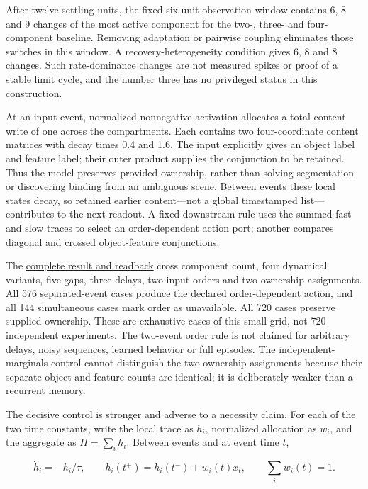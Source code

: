 \documentclass[
  american,
  11pt,
  letterpaper,
]{article}
\begin{document}
After twelve settling units, the fixed six-unit observation window contains 6, 8 and 9 changes of the most active component for the two-, three- and four-component baseline. Removing adaptation or pairwise coupling eliminates those switches in this window. A recovery-heterogeneity condition gives 6, 8 and 8 changes. Such rate-dominance changes are not measured spikes or proof of a stable limit cycle, and the number three has no privileged status in this construction.

At an input event, normalized nonnegative activation allocates a total content write of one across the compartments. Each contains two four-coordinate content matrices with decay times 0.4 and 1.6. The input explicitly gives an object label and feature label; their outer product supplies the conjunction to be retained. Thus the model preserves provided ownership, rather than solving segmentation or discovering binding from an ambiguous scene. Between events these local states decay, so retained earlier content---not a global timestamped list---contributes to the next readout. A fixed downstream rule uses the summed fast and slow traces to select an order-dependent action port; another compares diagonal and crossed object-feature conjunctions.

The \href{https://github.com/v5ma/v5ma.github.io/blob/f6d3867df89ae9dea32f763b1d55c84212c41cc6/papers/companions/five-papers-20260923/temporal/paper/applications/local-content-v05/README.md}{complete result and readback} cross component count, four dynamical variants, five gaps, three delays, two input orders and two ownership assignments. All 576 separated-event cases produce the declared order-dependent action, and all 144 simultaneous cases mark order as unavailable. All 720 cases preserve supplied ownership. These are exhaustive cases of this small grid, not 720 independent experiments. The two-event order rule is not claimed for arbitrary delays, noisy sequences, learned behavior or full episodes. The independent-marginals control cannot distinguish the two ownership assignments because their separate object and feature counts are identical; it is deliberately weaker than a recurrent memory.

The decisive control is stronger and adverse to a necessity claim. For each of the two time constants, write the local trace as \(h_i\), normalized allocation as \(w_i\), and the aggregate as \(H=\sum_i h_i\). Between events and at event time \(t\),

\[
\dot h_i=-h_i/\tau,\qquad h_i(t^+)=h_i(t^-)+w_i(t)x_t,\qquad \sum_i w_i(t)=1. \tag{7}
\]
\end{document}

